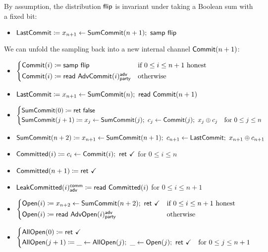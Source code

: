 \noindent By assumption, the distribution $\mathsf{flip}$ is invariant under taking a Boolean sum with a fixed bit:

\begin{itemize}
\item $\mathsf{LastCommit} \coloneqq x_{n+1} \leftarrow \mathsf{SumCommit}(n+1); \ \mathsf{samp} \ \mathsf{flip}$
\end{itemize}

\noindent We can unfold the sampling back into a new internal channel $\mathsf{Commit}(n+1)$:

\begin{itemize}
\item {\color{blue} $\begin{cases*} \Commit(i) \coloneqq \samp{\flip} & \text{if $0 \leq i \leq n+1$ honest} \\ \Commit(i) \coloneqq \read{\AdvCommit(i)^\adv_\party} & \text{otherwise} \end{cases*}$}
\item {\color{blue} $\mathsf{LastCommit} \coloneqq x_{n+1} \leftarrow \mathsf{SumCommit}(n); \ \mathsf{read} \ \mathsf{Commit}(n+1)$}
\item {\color{blue} $\begin{cases*} \SumCommit(0) \coloneqq \ret{\false} & \\ \SumCommit(j+1) \coloneqq x_j \leftarrow \SumCommit(j); \ c_j \leftarrow \Commit(j); \ x_j \oplus c_j & \text{for $0 \leq j \leq n$} \end{cases*}$}
\item {\color{blue} $\SumCommit(n+2) \coloneqq x_{n+1} \leftarrow \SumCommit(n+1); \ c_{n+1} \leftarrow \LastCommit; \ x_{n+1} \oplus c_{n+1}$}
\item {\color{magenta} $\mathsf{Committed}(i) \coloneqq c_i \leftarrow \mathsf{Commit}(i); \ \mathsf{ret} \ \checkmark$ for $0 \leq i \leq n$}
\item {\color{magenta} $\mathsf{Committed}(n+1) \coloneqq \mathsf{ret} \ \checkmark$}
\item {\color{magenta} $\mathsf{LeakCommitted}(i)^{\mathsf{comm}}_{\mathsf{adv}} \coloneqq \mathsf{read} \ \mathsf{Committed}(i)$ for $0 \leq i \leq n+1$}
\item {\color{teal} $\begin{cases*} \Open(i) \coloneqq x_{n+2} \leftarrow \SumCommit(n+2); \ \ret{\checkmark} & \text{if $0 \leq i \leq n+1$ honest} \\ \Open(i) \coloneqq \read{\AdvOpen(i)^\adv_\party} & \text{otherwise} \end{cases*}$}
\item {\color{teal} $\begin{cases*} \AllOpen(0) \coloneqq \ret{\checkmark} & \\ \AllOpen(j+1) \coloneqq \_ \leftarrow \AllOpen(j); \ \_ \leftarrow \Open(j); \ \ret{\checkmark} & \text{for $0 \leq j \leq n+1$} \end{cases*}$}

\end{itemize}
